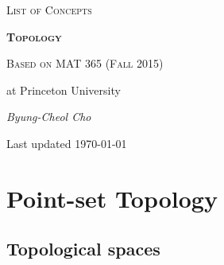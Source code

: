 \documentclass[letterpaper, 12pt]{book}
\begin{document}
\begin{titlepage}
    \centering
    \vspace*{5cm}
    {\scshape\LARGE List of Concepts \par}
    \vspace{1.5cm}
    {\Huge\bfseries \textsc{Topology}\par}
    \vspace{1.5cm}
    {\scshape\large Based on MAT 365 (Fall 2015)\par at Princeton University\par}
    \vspace{1.5cm}
    {\Large\itshape Byung-Cheol Cho\par}
    \vfill

    {\large Last updated \today\par}
\end{titlepage}

\tableofcontents

\part{Point-set Topology}

\chapter{Topological spaces}
\end{document}
